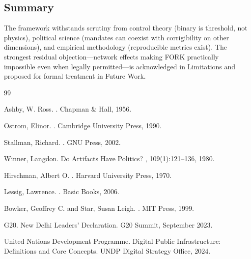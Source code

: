 \subsection{Summary}

The framework withstands scrutiny from control theory (binary is threshold, not physics), political science (mandates can coexist with corrigibility on other dimensions), and empirical methodology (reproducible metrics exist). The strongest residual objection---network effects making FORK practically impossible even when legally permitted---is acknowledged in Limitations and proposed for formal treatment in Future Work.


\begin{thebibliography}{99}

Ashby, W. Ross.
.
\newblock Chapman \& Hall, 1956.

Ostrom, Elinor.
.
\newblock Cambridge University Press, 1990.

Stallman, Richard.
.
\newblock GNU Press, 2002.

Winner, Langdon.
\newblock Do Artifacts Have Politics?
, 109(1):121--136, 1980.

Hirschman, Albert O.
.
\newblock Harvard University Press, 1970.

Lessig, Lawrence.
.
\newblock Basic Books, 2006.

Bowker, Geoffrey C. and Star, Susan Leigh.
.
\newblock MIT Press, 1999.

G20.
\newblock New Delhi Leaders' Declaration.
\newblock G20 Summit, September 2023.

United Nations Development Programme.
\newblock Digital Public Infrastructure: Definitions and Core Concepts.
\newblock UNDP Digital Strategy Office, 2024.


\end{thebibliography}
